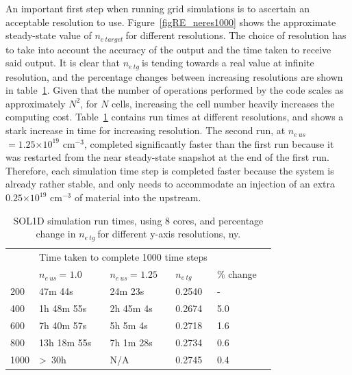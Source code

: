 \documentclass[12pt]{article}  %
\providecommand{\e}[1]{\ensuremath{\times 10^{#1}}} %
\providecommand{\neus}{$n_{e~us}~$} %
\providecommand{\netarget}{$n_{e~target}~$} %
\providecommand{\netg}{$n_{e~tg}~$} %
\begin{document}
An important first step when running grid simulations is to ascertain an acceptable resolution to use. Figure~\ref{figRE_neres1000} shows the approximate steady-state value of \netarget for different resolutions. The choice of resolution has to take into account the accuracy of the output and the time taken to receive said output. It is clear that \netg is tending towards a real value at infinite resolution, and the percentage changes between increasing resolutions are shown in table~\ref{tabsol1dres}. Given that the number of operations performed by the code scales as approximately $N^2$, for $N$ cells, increasing the cell number heavily increases the computing cost. Table~\ref{tabsol1dres} contains run times at different resolutions, and shows a stark increase in time for increasing resolution. The second run, at \neus $= 1.25\e{19}$ cm$^{-3}$, completed significantly faster than the first run because it was restarted from the near steady-state snapshot at the end of the first run. Therefore, each simulation time step is completed faster because the system is already rather stable, and only needs to accommodate an injection of an extra $0.25\e{19}$ cm$^{-3}$ of material into the upstream.

\begin{table}[]
	\centering
	\caption{SOL1D simulation run times, using 8 cores, and percentage change in \netg for different y-axis resolutions, ny.}
	\label{tabsol1dres}
	\begin{tabular}{l|l|l|l|l|l}
		\multicolumn{1}{l|}{\multirow{2}{*}{}} & \multicolumn{3}{l}{Time taken to complete 1000 time steps}    \\ \cline{2-3} 
		\multicolumn{1}{l|}{Resolution}        & \multicolumn{1}{l|}{\neus = $1.0$} & \multicolumn{1}{l|}{\neus = $1.25$}  & \netg & \% change  \\ \hline
		200                 &      47m 44s          &    24m 23s         &  0.2540 &  -    \\
		400                 &      1h 48m 55s       &    2h 45m 4s       &  0.2674 & 5.0   \\
		600                 &      7h 40m 57s       &    5h 5m 4s        &  0.2718 & 1.6   \\
		800                 &      13h 18m 55s      &    7h 1m 28s       &  0.2734 & 0.6  \\
		1000                &   \textgreater~30h    &       N/A          &  0.2745 & 0.4
	\end{tabular}
\end{table}
\end{document}

